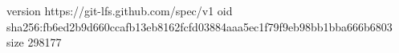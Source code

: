 version https://git-lfs.github.com/spec/v1
oid sha256:fb6ed2b9d660ccafb13eb8162fcfd03884aaa5ec1f79f9eb98bb1bba666b6803
size 298177
